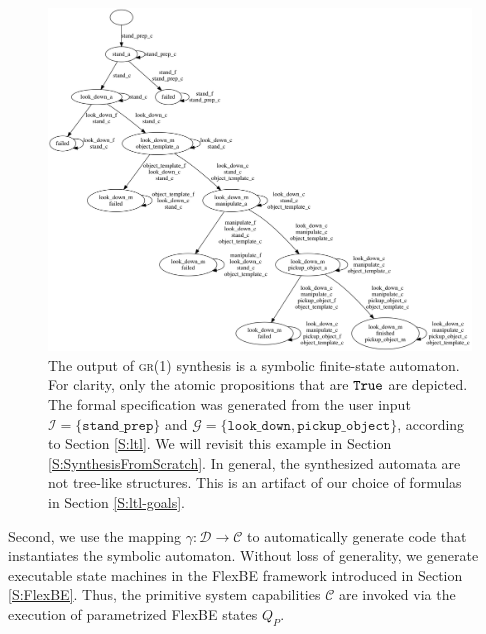 \begin{figure}[t]
\centering
\includegraphics[width=0.95\columnwidth,clip]{./img/synthesized_automaton.png}
\caption{
	The output of \textsc{gr(1)} synthesis is a symbolic finite-state automaton.
	For clarity, only the atomic propositions that are $\mathtt{True}$ are depicted.
	The formal specification was generated from the user input $\mathcal{I} = \{ \mathtt{stand\_prep} \}$ and $\mathcal{G} = \{ \mathtt{look\_down, pickup\_object} \}$, according to Section \ref{S:ltl}.
	We will revisit this example in Section \ref{S:SynthesisFromScratch}.
	In general, the synthesized automata are not tree-like structures.
	This is an artifact of our choice of formulas in Section \ref{S:ltl-goals}.
}
\label{Fig:SynthesizedAutomaton}
\vspace{-10pt}
\end{figure}

Second, we use the mapping $\gamma: \mathcal{D} \rightarrow \mathcal{C}$ to automatically generate code that instantiates the symbolic automaton.
Without loss of generality, we generate executable state machines in the FlexBE framework introduced in Section \ref{S:FlexBE}.
Thus, the primitive system capabilities $\mathcal{C}$ are invoked via the execution of parametrized FlexBE states $Q_P$.

